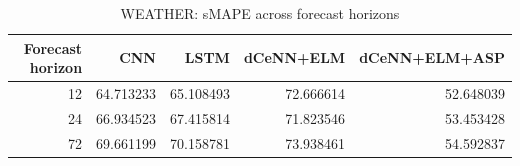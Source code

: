 \begin{table}
\caption{WEATHER: sMAPE across forecast horizons}
\begin{tabular}{rrrrr}
\toprule
Forecast horizon & CNN & LSTM & dCeNN+ELM & dCeNN+ELM+ASP \\
\midrule
12 & 64.713233 & 65.108493 & 72.666614 & 52.648039 \\
24 & 66.934523 & 67.415814 & 71.823546 & 53.453428 \\
72 & 69.661199 & 70.158781 & 73.938461 & 54.592837 \\
\bottomrule
\end{tabular}
\end{table}
